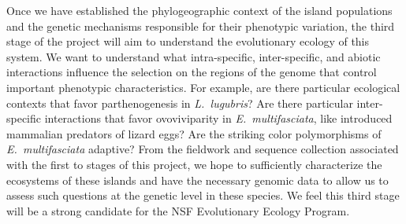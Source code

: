 \documentclass[10pt]{article}
\begin{document}
Once we have established the phylogeographic context of the island populations
and the genetic mechanisms responsible for their phenotypic variation, the
third stage of the project will aim to understand the evolutionary ecology of
this system.
We want to understand what intra-specific, inter-specific, and abiotic
interactions influence the selection on the regions of the genome that control
important phenotypic characteristics.
For example, are there particular ecological contexts that favor
parthenogenesis in \emph{L.\ lugubris}?
Are there particular inter-specific interactions that favor ovoviviparity in
\emph{E.\ multifasciata}, like introduced mammalian predators of lizard eggs?
Are the striking color polymorphisms of \emph{E.\ multifasciata} adaptive?
From the fieldwork and sequence collection associated with the first to stages
of this project, we hope to sufficiently characterize the ecosystems of these
islands and have the necessary genomic data to allow us to assess such
questions at the genetic level in these species.
We feel this third stage will be a strong candidate for the NSF Evolutionary
Ecology Program.
\end{document}
